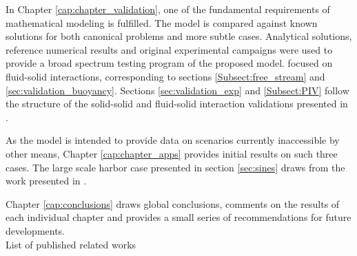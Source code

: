In Chapter \ref{cap:chapter_validation}, one of the fundamental requirements of mathematical modeling is fulfilled. The model is compared against known solutions for both canonical problems and more subtle cases. Analytical solutions, reference numerical results and original experimental campaigns were used to provide a broad spectrum testing program of the proposed model. \cite{Canelas-al-2015a} focused on fluid-solid interactions, corresponding to sections \ref{Subsect:free_stream} and \ref{sec:validation_buoyancy}. Sections \ref{sec:validation_exp} and \ref{Subsect:PIV} follow the structure of the solid-solid and fluid-solid interaction validations presented in \cite{Canelas-al-2015b}.

As the model is intended to provide data on scenarios currently inaccessible by other means, Chapter \ref{cap:chapter_apps} provides initial results on such three cases. The large scale harbor case presented in section \ref{sec:sines} draws from the work presented in \cite{Canelas-al-2014}.

Chapter \ref{cap:conclusions} draws global conclusions, comments on the results of each individual chapter and provides a small series of recommendations for future developments.\\

List of published related works

